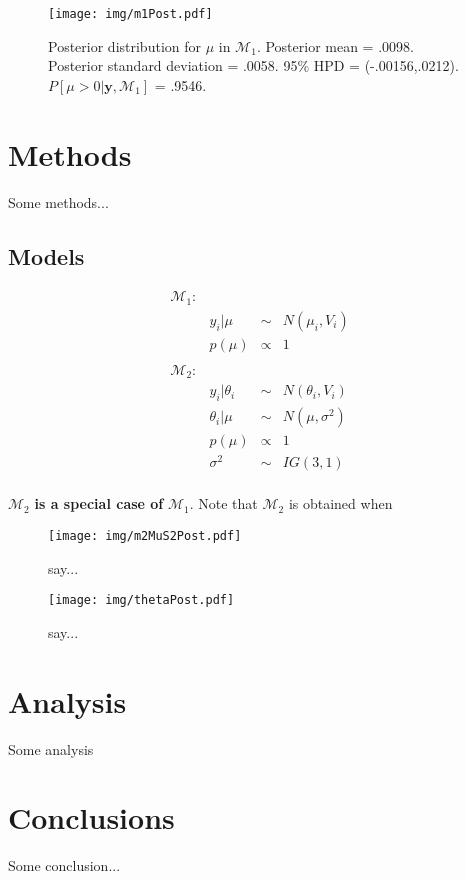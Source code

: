 \documentclass{../../tex_template/asaproc}
\newcommand{\bk}[1]{\left[#1\right]}
\newcommand{\M}{\mathcal{M}}
\begin{document}
\begin{figure}[H]
  \texttt{[image: img/m1Post.pdf]}
  \caption{\small Posterior distribution for $\mu$ in $\M_1$.
  Posterior mean = .0098. Posterior standard deviation = .0058.
  95\% HPD = (-.00156,.0212). $P\bk{\mu>0|\bm{y},\M_1}$ = .9546.}
  \label{fig:m1Post}
\end{figure}



\section{Methods}
Some methods...

\subsection{Models}

$$
\begin{array}{lrcl}
  \M_1: \\
  & y_i | \mu &\sim& N(\mu_i,V_i)\\
  & p(\mu) &\propto& 1\\
  \\
  \M_2: \\
  & y_i | \theta_i &\sim& N(\theta_i,V_i)\\
  & \theta_i | \mu &\sim& N(\mu,\sigma^2)\\
  & p(\mu) &\propto& 1\\
  & \sigma^2 &\sim& IG(3,1)\\
\end{array}
$$

$\M_2$ \textbf{is a special case of} $\M_1$. Note that $\M_2$ is
obtained when 

\begin{figure}[H]
  \texttt{[image: img/m2MuS2Post.pdf]}
  \caption{say...}
  \label{fig:m2MuS2Post}
\end{figure}

\begin{figure}[H]
  \texttt{[image: img/thetaPost.pdf]}
  \caption{say...}
  \label{fig:thetaPost}
\end{figure}


\section{Analysis}
Some analysis

\section{Conclusions}
Some conclusion...
\end{document}
